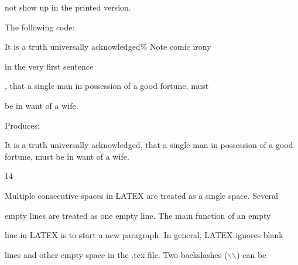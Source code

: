 \documentclass[a4paper,portrait,12pt]{article}
\begin{document}
\begin{flushleft}
not show up in the printed version.
\end{flushleft}


\begin{flushleft}
The following code:
\end{flushleft}


\begin{flushleft}
It is a truth universally acknowledged\% Note comic irony
\end{flushleft}


\begin{flushleft}
in the very first sentence
\end{flushleft}


\begin{flushleft}
, that a single man in possession of a good fortune, must
\end{flushleft}


\begin{flushleft}
be in want of a wife.
\end{flushleft}


\begin{flushleft}
Produces:
\end{flushleft}


\begin{flushleft}
It is a truth universally acknowledged, that a single man in possession of a good fortune, must be in want of a wife.
\end{flushleft}


14





\begin{flushleft}
\newpage
Multiple consecutive spaces in LATEX are treated as a single space. Several
\end{flushleft}


\begin{flushleft}
empty lines are treated as one empty line. The main function of an empty
\end{flushleft}


\begin{flushleft}
line in LATEX is to start a new paragraph. In general, LATEX ignores blank
\end{flushleft}


\begin{flushleft}
lines and other empty space in the .tex file. Two backslashes (\ensuremath{\backslash}\ensuremath{\backslash}) can be
\end{flushleft}
\end{document}
